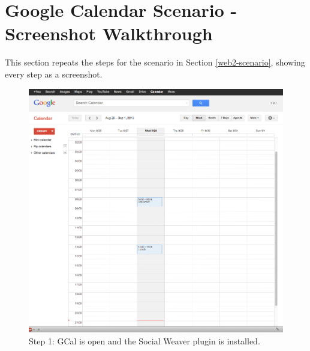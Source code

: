 \label{apndx_usecases}


\newpage
\section{Google Calendar Scenario - Screenshot  Walkthrough}
This section repeats the steps for the scenario in Section \ref{web2-scenario}, showing every step as a screenshot. 

\begin{figure}[!h]\centering
		\includegraphics[width=13cm]{images/gcal-screenshot-walkthrough/gcal-wt-1.png}
		\caption{Step 1: GCal is open and the Social Weaver plugin is installed.}
		\label{gcal-wt-1}
\end{figure} 

